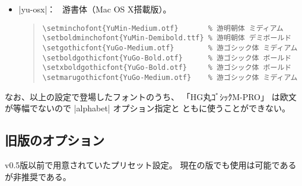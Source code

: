 \documentclass[a4paper,uplatex]{jsarticle}
\newcommand{\Means}{：\ }
\begin{document}
\begin{itemize}
\item |yu-osx|\Means
  游書体（Mac OS X搭載版）。
\begin{quote}\small\begin{verbatim}
\setminchofont{YuMin-Medium.otf}       % 游明朝体 ミディアム
\setboldminchofont{YuMin-Demibold.ttf} % 游明朝体 デミボールド
\setgothicfont{YuGo-Medium.otf}        % 游ゴシック体 ミディアム
\setboldgothicfont{YuGo-Bold.otf}      % 游ゴシック体 ボールド
\setxboldgothicfont{YuGo-Bold.otf}     % 游ゴシック体 ボールド
\setmarugothicfont{YuGo-Medium.otf}    % 游ゴシック体 ミディアム
\end{verbatim}\end{quote}
\end{itemize}

なお、以上の設定で登場したフォントのうち、
「HG丸ｺﾞｼｯｸM-PRO」
は欧文が等幅でないので |alphabet| オプション指定と
ともに使うことができない。

\subsection{旧版のオプション}

v0.5版以前で用意されていたプリセット設定。
現在の版でも使用は可能であるが非推奨である。
\end{document}
